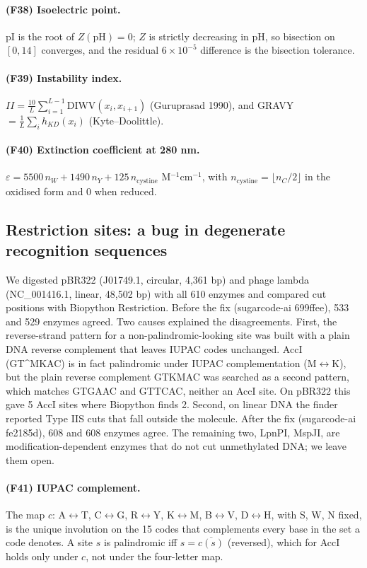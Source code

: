 \paragraph{(F38) Isoelectric point.} $\mathrm{pI}$ is the root of $Z(\mathrm{pH})=0$; $Z$ is strictly decreasing in pH, so bisection on $[0,14]$ converges, and the residual $6\times10^{-5}$ difference is the bisection tolerance.
\paragraph{(F39) Instability index.} $II=\frac{10}{L}\sum_{i=1}^{L-1}\mathrm{DIWV}(x_i,x_{i+1})$ (Guruprasad 1990), and GRAVY $=\frac1L\sum_i h_{KD}(x_i)$ (Kyte--Doolittle).
\paragraph{(F40) Extinction coefficient at 280 nm.} $\varepsilon=5500\,n_W+1490\,n_Y+125\,n_{\mathrm{cystine}}$ M$^{-1}$cm$^{-1}$, with $n_{\mathrm{cystine}}=\lfloor n_C/2\rfloor$ in the oxidised form and $0$ when reduced.
\subsection{Restriction sites: a bug in degenerate recognition sequences}
We digested pBR322 (J01749.1, circular, 4,361 bp) and phage lambda (NC\_001416.1, linear, 48,502 bp) with all 610 enzymes and compared cut positions with Biopython Restriction. Before the fix (sugarcode-ai 699ffee), 533 and 529 enzymes agreed. Two causes explained the disagreements. First, the reverse-strand pattern for a non-palindromic-looking site was built with a plain DNA reverse complement that leaves IUPAC codes unchanged. AccI (GT\^{}MKAC) is in fact palindromic under IUPAC complementation (M$\leftrightarrow$K), but the plain reverse complement GTKMAC was searched as a second pattern, which matches GTGAAC and GTTCAC, neither an AccI site. On pBR322 this gave 5 AccI sites where Biopython finds 2. Second, on linear DNA the finder reported Type IIS cuts that fall outside the molecule. After the fix (sugarcode-ai fe2185d), 608 and 608 enzymes agree. The remaining two, LpnPI, MspJI, are modification-dependent enzymes that do not cut unmethylated DNA; we leave them open.
\paragraph{(F41) IUPAC complement.} The map $c$: A$\leftrightarrow$T, C$\leftrightarrow$G, R$\leftrightarrow$Y, K$\leftrightarrow$M, B$\leftrightarrow$V, D$\leftrightarrow$H, with S, W, N fixed, is the unique involution on the 15 codes that complements every base in the set a code denotes. A site $s$ is palindromic iff $s=\overline{c(s)}$ (reversed), which for AccI holds only under $c$, not under the four-letter map.
